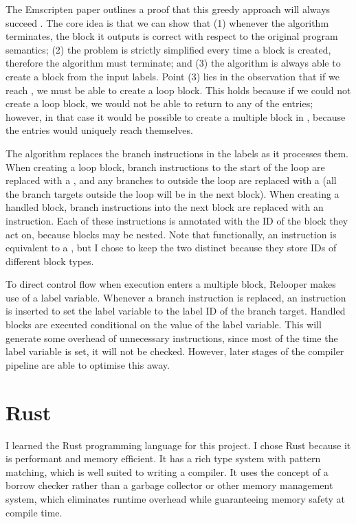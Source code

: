 \documentclass[00-main.tex]{subfiles}
\begin{document}
The Emscripten paper outlines a proof that this greedy approach will always succeed .
The core idea is that we can show that (1) whenever the algorithm terminates, the block it outputs is correct with respect to the original program semantics; (2) the problem is strictly simplified every time a block is created, therefore the algorithm must terminate; and (3) the algorithm is always able to create a block from the input labels.
Point (3) lies in the observation that if we reach , we must be able to create a loop block.
This holds because if we could not create a loop block, we would not be able to return to any of the entries; however, in that case it would be possible to create a multiple block in , because the entries would uniquely reach themselves.

The algorithm replaces the branch instructions in the labels as it processes them.
When creating a loop block, branch instructions to the start of the loop are replaced with a , and any branches to outside the loop are replaced with a  (all the branch targets outside the loop will be in the next block).
When creating a handled block, branch instructions into the next block are replaced with an  instruction.
Each of these instructions is annotated with the ID of the block they act on, because blocks may be nested.
Note that functionally, an  instruction is equivalent to a , but I chose to keep the two distinct because they store IDs of different block types.

To direct control flow when execution enters a multiple block, Relooper makes use of a label variable.
Whenever a branch instruction is replaced, an instruction is inserted to set the label variable to the label ID of the branch target.
Handled blocks are executed conditional on the value of the label variable.
This will generate some overhead of unnecessary instructions, since most of the time the label variable is set, it will not be checked.
However, later stages of the compiler pipeline are able to optimise this away.


\section{Rust}\label{sec:prep:rust}

I learned the Rust programming language  for this project.
I chose Rust because it is performant and memory efficient.
It has a rich type system with pattern matching, which is well suited to writing a compiler.
It uses the concept of a borrow checker rather than a garbage collector or other memory management system, which eliminates runtime overhead while guaranteeing memory safety at compile time.
\end{document}
